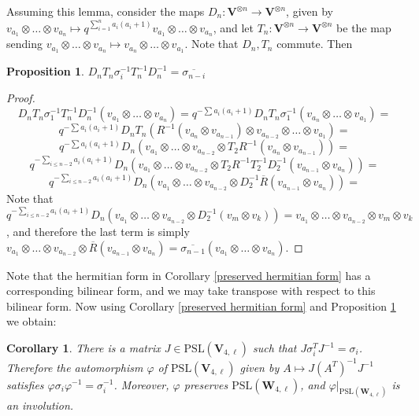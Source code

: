 \documentclass[letterpaper]{amsart}
\newtheorem{corollary}[theorem]{Corollary}
\newtheorem{proposition}[theorem]{Proposition}
\begin{document}
Assuming this lemma, consider the maps $D_n: \textbf{V}^{\otimes n} \to \textbf{V}^{\otimes n}$, given by $v_{a_1} \otimes \dots \otimes v_{a_n} \mapsto q^{\sum_{i=1}^n a_i(a_i+1)} v_{a_1} \otimes \dots \otimes v_{a_n}$, and let $T_n : \textbf{V}^{\otimes n} \to \textbf{V}^{\otimes n}$ be the map sending $v_{a_1} \otimes \dots \otimes v_{a_n} \mapsto v_{a_n} \otimes \dots \otimes v_{a_1}$. Note that $D_n,T_n$ commute. Then
\begin{proposition}
\label{Inverse conjugate to bar}
    $D_nT_n\sigma_i^{-1}T_n^{-1}D_n^{-1} = \overline{\sigma_{n - i}}$
\end{proposition}
\begin{proof}
    $$D_nT_n\sigma_1^{-1}T_n^{-1}D_n^{-1}(v_{a_1} \otimes \dots \otimes v_{a_n}) = q^{-\sum a_i(a_i + 1)} D_nT_n\sigma_1^{-1}(v_{a_n} \otimes \dots \otimes v_{a_1}) =$$
    $$q^{-\sum a_i(a_i + 1)} D_nT_n(R^{-1}(v_{a_n} \otimes v_{a_{n - 1}}) \otimes v_{a_{n-2}} \otimes \dots \otimes v_{a_1}) =$$
    $$ q^{-\sum a_i(a_i + 1)} D_n(v_{a_1} \otimes \dots \otimes v_{a_{n-2}} \otimes T_2R^{-1}(v_{a_n} \otimes v_{a_{n-1}}))=$$
    $$q^{-\sum_{i \leq n - 2} a_i(a_i + 1)}D_n(v_{a_1} \otimes \dots \otimes v_{a_{n-2}} \otimes T_2R^{-1}T_2^{-1}D_2^{-1}(v_{a_{n-1}} \otimes v_{a_n})) =$$
    $$q^{-\sum_{i \leq n - 2} a_i(a_i + 1)}D_n(v_{a_1} \otimes \dots \otimes v_{a_{n-2}} \otimes D_2^{-1}\overline{R}(v_{a_{n-1}} \otimes v_{a_n})) =$$
    Note that $q^{-\sum_{i \leq n - 2} a_i(a_i + 1)}D_n(v_{a_1} \otimes \dots \otimes v_{a_{n - 2}} \otimes  D_2^{-1}(v_m \otimes v_k) ) = v_{a_1} \otimes \dots \otimes v_{a_{n - 2}} \otimes v_m \otimes v_k $, and therefore the last term is simply $v_{a_1} \otimes \dots \otimes v_{a_{n-2}} \otimes \overline{R}(v_{a_{n-1}} \otimes v_{a_n}) = \overline{\sigma_{n-1}}(v_{a_1} \otimes \dots \otimes v_{a_n})$.
\end{proof}
Note that the hermitian form in Corollary \ref{preserved hermitian form} has a corresponding bilinear form, and we may take transpose with respect to this bilinear form. Now using Corollary \ref{preserved hermitian form} and Proposition \ref{Inverse conjugate to bar} we obtain:
\begin{corollary}
\label{Extension of representation to AutF2}
There is a matrix $J \in \mathrm{PSL}(\textbf{V}_{4,\ell})$ such that $J\sigma_i^TJ^{-1} = \sigma_i$.
Therefore the automorphism $\varphi$ of $\mathrm{PSL}(\textbf{V}_{4,\ell})$ given by $A \mapsto J(A^T)^{-1}J^{-1}$ satisfies $\varphi \sigma_i \varphi^{-1} = \sigma_i^{-1}$. 
Moreover, $\varphi$ preserves $\mathrm{PSL}(\textbf{W}_{4, \ell})$, and $\varphi|_{\mathrm{PSL}(\textbf{W}_{4, \ell})}$ is an involution.
\end{corollary}
\end{document}
